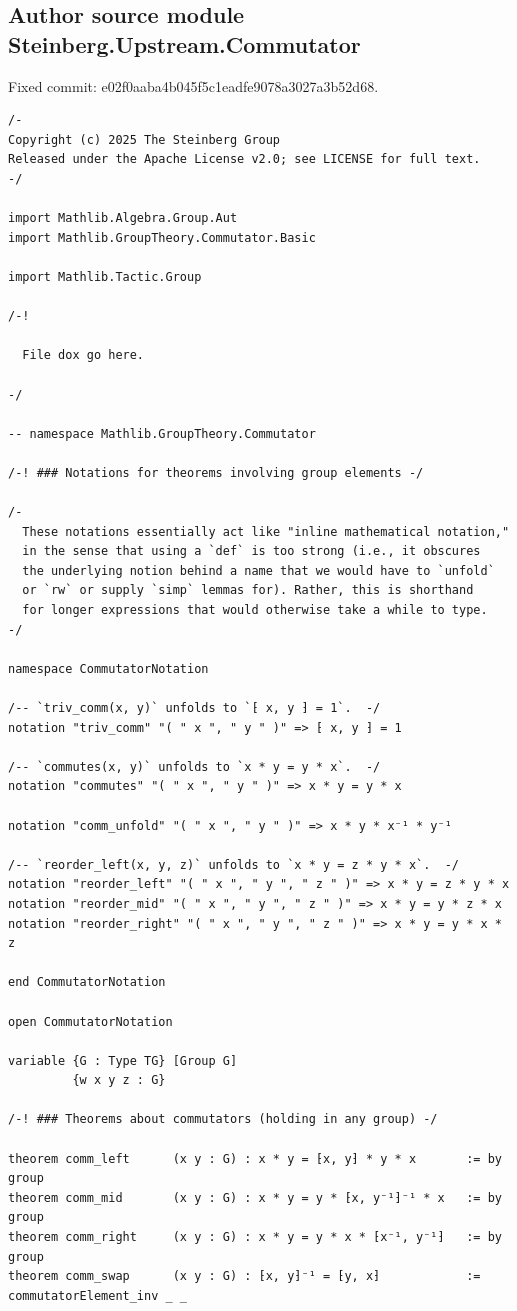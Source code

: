 \subsection*{Author source module Steinberg.Upstream.Commutator}
\noindent Fixed commit: e02f0aaba4b045f5c1eadfe9078a3027a3b52d68.
\begin{Verbatim}
/-
Copyright (c) 2025 The Steinberg Group
Released under the Apache License v2.0; see LICENSE for full text.
-/

import Mathlib.Algebra.Group.Aut
import Mathlib.GroupTheory.Commutator.Basic

import Mathlib.Tactic.Group

/-!

  File dox go here.

-/

-- namespace Mathlib.GroupTheory.Commutator

/-! ### Notations for theorems involving group elements -/

/-
  These notations essentially act like "inline mathematical notation,"
  in the sense that using a `def` is too strong (i.e., it obscures
  the underlying notion behind a name that we would have to `unfold`
  or `rw` or supply `simp` lemmas for). Rather, this is shorthand
  for longer expressions that would otherwise take a while to type.
-/

namespace CommutatorNotation

/-- `triv_comm(x, y)` unfolds to `⁅ x, y ⁆ = 1`.  -/
notation "triv_comm" "( " x ", " y " )" => ⁅ x, y ⁆ = 1

/-- `commutes(x, y)` unfolds to `x * y = y * x`.  -/
notation "commutes" "( " x ", " y " )" => x * y = y * x

notation "comm_unfold" "( " x ", " y " )" => x * y * x⁻¹ * y⁻¹

/-- `reorder_left(x, y, z)` unfolds to `x * y = z * y * x`.  -/
notation "reorder_left" "( " x ", " y ", " z " )" => x * y = z * y * x
notation "reorder_mid" "( " x ", " y ", " z " )" => x * y = y * z * x
notation "reorder_right" "( " x ", " y ", " z " )" => x * y = y * x * z

end CommutatorNotation

open CommutatorNotation

variable {G : Type TG} [Group G]
         {w x y z : G}

/-! ### Theorems about commutators (holding in any group) -/

theorem comm_left      (x y : G) : x * y = ⁅x, y⁆ * y * x       := by group
theorem comm_mid       (x y : G) : x * y = y * ⁅x, y⁻¹⁆⁻¹ * x   := by group
theorem comm_right     (x y : G) : x * y = y * x * ⁅x⁻¹, y⁻¹⁆   := by group
theorem comm_swap      (x y : G) : ⁅x, y⁆⁻¹ = ⁅y, x⁆            := commutatorElement_inv _ _


\end{Verbatim}
